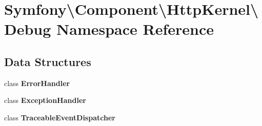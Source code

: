 \section{Symfony\textbackslash{}Component\textbackslash{}Http\+Kernel\textbackslash{}Debug Namespace Reference}
\label{namespace_symfony_1_1_component_1_1_http_kernel_1_1_debug}
\subsection*{Data Structures}
\begin{DoxyCompactItemize}
\item 
class {\bf Error\+Handler}
\item 
class {\bf Exception\+Handler}
\item 
class {\bf Traceable\+Event\+Dispatcher}
\end{DoxyCompactItemize}
